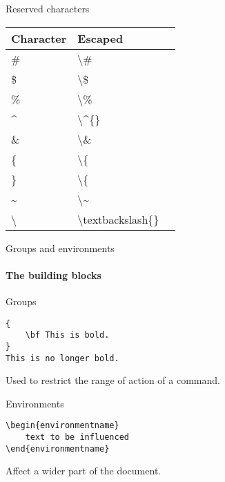 \documentclass[compress]{beamer}
\begin{document}
\begin{frame}{Reserved characters}
    \begin{center}
        \begin{tabular}{llr}
            \toprule
            Character           & Escaped                           \\
            \midrule
            \#                  & \textbackslash{}\#                \\
            \midrule
            \$                  & \textbackslash{}\$                \\
            \midrule
            \%                  & \textbackslash{}\%                \\
            \midrule
            \^{}                & \textbackslash{}\^{}\{\}          \\
            \midrule
            \&                  & \textbackslash{}\&                \\
            \midrule
            \{                  & \textbackslash{}\{                \\
            \midrule
            \}                  & \textbackslash{}\{                \\
            \midrule
            \~{}                & \textbackslash{}\~{}              \\
            \midrule
            \textbackslash{}    & \textbackslash{}textbackslash\{\} \\
            \bottomrule
        \end{tabular}
    \end{center}
\end{frame}

\begin{frame}[fragile]{Groups and environments}
    \framesubtitle{The building blocks}
    \begin{block}{Groups}
\begin{lstlisting}
{
    \bf This is bold.
}
This is no longer bold.
\end{lstlisting}
    Used to restrict the range of action of a command.
    \end{block}
    \begin{block}{Environments}
\begin{lstlisting}
\begin{environmentname}
    text to be influenced
\end{environmentname}
\end{lstlisting}
    Affect a wider part of the document.
    \end{block}
\end{frame}
\end{document}
